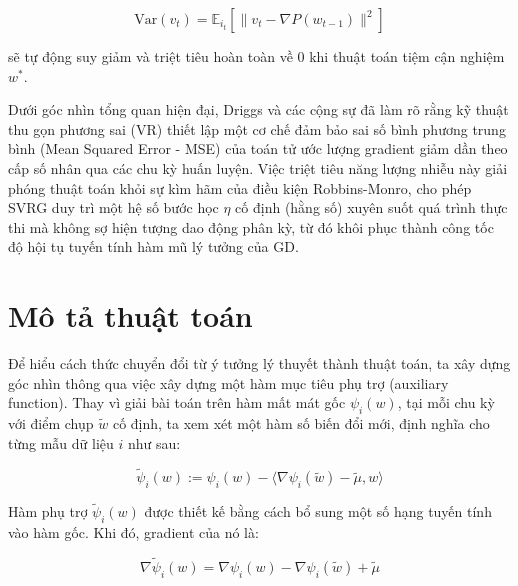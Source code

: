 \begin{equation}
\text{Var}(v_t) = \mathbb{E}_{i_t} \left[ \|v_t - \nabla P(w_{t-1})\|^2 \right]
\end{equation}

sẽ tự động suy giảm và triệt tiêu hoàn toàn về 0 khi thuật toán tiệm cận nghiệm $w^*$. 


Dưới góc nhìn tổng quan hiện đại, Driggs và các cộng sự \cite{driggs2022accelerating} đã làm rõ rằng kỹ thuật thu gọn phương sai (VR) thiết lập một cơ chế đảm bảo sai số bình phương trung bình (Mean Squared Error - MSE) của toán tử ước lượng gradient giảm dần theo cấp số nhân qua các chu kỳ huấn luyện. Việc triệt tiêu năng lượng nhiễu này giải phóng thuật toán khỏi sự kìm hãm của điều kiện Robbins-Monro, cho phép SVRG duy trì một hệ số bước học $\eta$ cố định (hằng số) xuyên suốt quá trình thực thi mà không sợ hiện tượng dao động phân kỳ, từ đó khôi phục thành công tốc độ hội tụ tuyến tính hàm mũ lý tưởng của GD.



\section{Mô tả thuật toán}






Để hiểu cách thức chuyển đổi từ ý tưởng lý thuyết thành thuật toán, ta xây dựng góc nhìn thông qua việc xây dựng một hàm mục tiêu phụ trợ (auxiliary function). Thay vì giải bài toán trên hàm mất mát gốc $\psi_i(w)$, tại mỗi chu kỳ với điểm chụp $\tilde{w}$ cố định, ta xem xét một hàm số biến đổi mới, định nghĩa cho từng mẫu dữ liệu $i$ như sau:

\begin{equation}
\tilde{\psi}_i(w) := \psi_i(w) - \langle \nabla \psi_i(\tilde{w}) - \tilde{\mu}, w \rangle
\end{equation}

Hàm phụ trợ $\tilde{\psi}_i(w)$ được thiết kế bằng cách bổ sung một số hạng tuyến tính vào hàm gốc. Khi đó, gradient của nó là:

\begin{equation}
\nabla \tilde{\psi}_i(w) = \nabla \psi_i(w) - \nabla \psi_i(\tilde{w}) + \tilde{\mu}
\end{equation}

